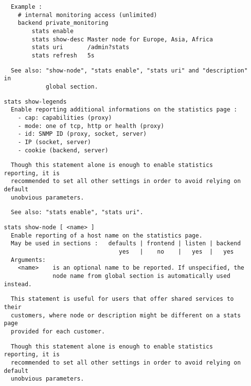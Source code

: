 \begin{verbatim}
  Example :
    # internal monitoring access (unlimited)
    backend private_monitoring
        stats enable
        stats show-desc Master node for Europe, Asia, Africa
        stats uri       /admin?stats
        stats refresh   5s
\end{verbatim}

\begin{verbatim}
  See also: "show-node", "stats enable", "stats uri" and "description" in
            global section.
\end{verbatim}

\begin{verbatim}
stats show-legends
  Enable reporting additional informations on the statistics page :
    - cap: capabilities (proxy)
    - mode: one of tcp, http or health (proxy)
    - id: SNMP ID (proxy, socket, server)
    - IP (socket, server)
    - cookie (backend, server)
\end{verbatim}

\begin{verbatim}
  Though this statement alone is enough to enable statistics reporting, it is
  recommended to set all other settings in order to avoid relying on default
  unobvious parameters.
\end{verbatim}

\begin{verbatim}
  See also: "stats enable", "stats uri".
\end{verbatim}

\begin{verbatim}
stats show-node [ <name> ]
  Enable reporting of a host name on the statistics page.
  May be used in sections :   defaults | frontend | listen | backend
                                 yes   |    no    |   yes  |   yes
  Arguments:
    <name>    is an optional name to be reported. If unspecified, the
              node name from global section is automatically used instead.
\end{verbatim}

\begin{verbatim}
  This statement is useful for users that offer shared services to their
  customers, where node or description might be different on a stats page
  provided for each customer.
\end{verbatim}

\begin{verbatim}
  Though this statement alone is enough to enable statistics reporting, it is
  recommended to set all other settings in order to avoid relying on default
  unobvious parameters.
\end{verbatim}

